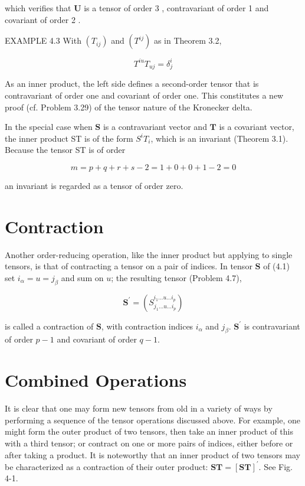 \documentclass[10pt]{article}
\begin{document}
which verifies that $\mathbf{U}$ is a tensor of order 3 , contravariant of order 1 and covariant of order 2 .

EXAMPLE 4.3 With $\left(T_{i j}\right)$ and $\left(T^{i j}\right)$ as in Theorem 3.2,

$$
T^{i u} T_{u j}=\delta_{j}^{i}
$$

As an inner product, the left side defines a second-order tensor that is contravariant of order one and covariant of order one. This constitutes a new proof (cf. Problem 3.29) of the tensor nature of the Kronecker delta.

In the special case when $\mathbf{S}$ is a contravariant vector and $\mathbf{T}$ is a covariant vector, the inner product ST is of the form $S^{i} T_{i}$, which is an invariant (Theorem 3.1). Because the tensor ST is of order

$$
m=p+q+r+s-2=1+0+0+1-2=0
$$

an invariant is regarded as a tensor of order zero.

\section*{Contraction}
Another order-reducing operation, like the inner product but applying to single tensors, is that of contracting a tensor on a pair of indices. In tensor $\mathbf{S}$ of (4.1) set $i_{\alpha}=u=j_{\beta}$ and sum on $u$; the resulting tensor (Problem 4.7),


\begin{equation*}
\mathbf{S}^{\prime}=\left(S_{j_{1} \ldots u \ldots i_{p}}^{i_{1} \ldots u \ldots i_{p}}\right) \tag{4.5}
\end{equation*}


is called a contraction of $\mathbf{S}$, with contraction indices $i_{\alpha}$ and $j_{\beta}$. $\mathbf{S}^{\prime}$ is contravariant of order $p-1$ and covariant of order $q-1$.

\section*{Combined Operations}
It is clear that one may form new tensors from old in a variety of ways by performing a sequence of the tensor operations discussed above. For example, one might form the outer product of two tensors, then take an inner product of this with a third tensor; or contract on one or more pairs of indices, either before or after taking a product. It is noteworthy that an inner product of two tensors may be characterized as a contraction of their outer product: $\mathbf{S T}=[\mathbf{S T}]^{\prime}$. See Fig. 4-1.
\end{document}
